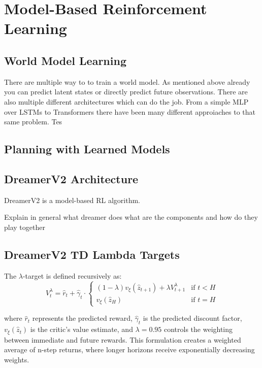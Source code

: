 \documentclass[
	english,
	ruledheaders=section,
	class=report,
	thesis={type=master},
	accentcolor=9c,
	custommargins=true,
	marginpar=false,
	parskip=half-,
	fontsize=11pt,
]{tudapub}
\begin{document}
\section{Model-Based Reinforcement Learning}
\label{sec:mbrl}

\subsection{World Model Learning}
\label{subsec:world_models}
There are multiple way to to train a world model. As mentioned above already you can predict latent states or directly predict future observations. There are also multiple different architectures which can do the job. From a simple MLP over LSTMs to Transformers there have been many different approiaches to that same problem. Tes

\subsection{Planning with Learned Models}
\label{subsec:planning}

\subsection{DreamerV2 Architecture}
\label{subsec:dreamerv2_arch}
DreamerV2 \cite{hafner2019dreamer} is a model-based RL algorithm.



Explain in general what dreamer does
what are the components and how do they play together

\subsection{DreamerV2 TD Lambda Targets}
\label{subsec:td_lambda}


The $\lambda$-target is defined recursively as:
\begin{equation}
V^{\lambda}_t = \hat{r}_t + \hat{\gamma}_t \cdot \begin{cases}
(1 - \lambda)v_\xi(\hat{z}_{t+1}) + \lambda V^{\lambda}_{t+1} & \text{if } t < H \\
v_\xi(\hat{z}_H) & \text{if } t = H
\end{cases}
\end{equation}

where $\hat{r}_t$ represents the predicted reward, $\hat{\gamma}_t$ is the predicted discount factor, $v_\xi(\hat{z}_t)$ is the critic's value estimate, and $\lambda = 0.95$ controls the weighting between immediate and future rewards. This formulation creates a weighted average of n-step returns, where longer horizons receive exponentially decreasing weights.
\end{document}

